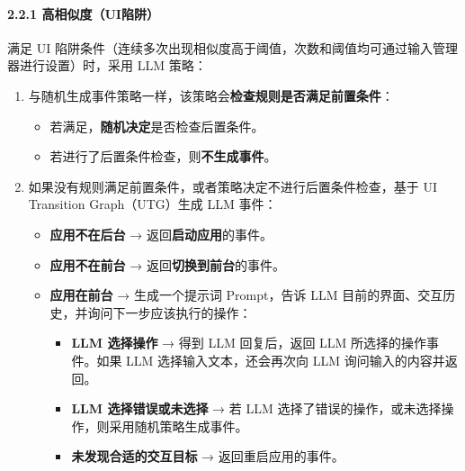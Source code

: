 \documentclass{article}[UTF8, fontset=windows]
\begin{document}
\paragraph{2.2.1 高相似度（UI陷阱）}
满足 UI 陷阱条件（连续多次出现相似度高于阈值，次数和阈值均可通过输入管理器进行设置）时，采用 LLM 策略：
\begin{enumerate}[leftmargin=2em]
    \item 与随机生成事件策略一样，该策略会\textbf{检查规则是否满足前置条件}：
    \begin{itemize}
        \item 若满足，\textbf{随机决定}是否检查后置条件。
        \item 若进行了后置条件检查，则\textbf{不生成事件}。
    \end{itemize}
    \item 如果没有规则满足前置条件，或者策略决定不进行后置条件检查，基于 UI Transition Graph（UTG）生成 LLM 事件：
    \begin{itemize}
        \item \textbf{应用不在后台} → 返回\textbf{启动应用}的事件。
        \item \textbf{应用不在前台} → 返回\textbf{切换到前台}的事件。
        \item \textbf{应用在前台} → 生成一个提示词 Prompt，告诉 LLM 目前的界面、交互历史，并询问下一步应该执行的操作：
        \begin{itemize}
            \item \textbf{LLM 选择操作} → 得到 LLM 回复后，返回 LLM 所选择的操作事件。如果 LLM 选择输入文本，还会再次向 LLM 询问输入的内容并返回。
            \item \textbf{LLM 选择错误或未选择} → 若 LLM 选择了错误的操作，或未选择操作，则采用随机策略生成事件。
            \item \textbf{未发现合适的交互目标} → 返回重启应用的事件。
        \end{itemize}
    \end{itemize}
\end{enumerate}
\end{document}
